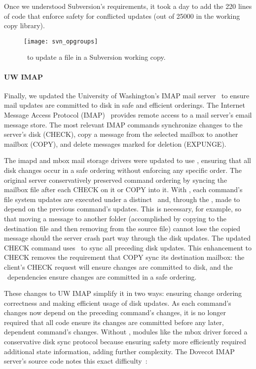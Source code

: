 Once we understood Subversion's requirements, it took a day to add
the 220 lines of code that enforce safety for conflicted updates (out of
25000 in the working copy library).

\begin{figure}[t]
  \centering
  \texttt{[image: svn\_opgroups]}
  \caption{\Patchgroups\ to update a file in a Subversion working copy.}
  \label{fig:svn-order}
\end{figure}

\paragraph{UW IMAP}
\label{sec:patchgroup:uwimap}

Finally, we updated the University of Washington's IMAP mail server~\cite{uwimap} to
ensure mail updates are committed to disk
in safe and efficient orderings.
%
The Internet Message Access Protocol (IMAP)~\cite{rfc3501} provides
remote access to a mail server's email message store.
%
The most relevant IMAP commands synchronize changes to the server's
disk (CHECK), copy a message from the selected mailbox to another
mailbox (COPY), and delete messages marked for deletion (EXPUNGE).

The imapd and mbox mail storage
drivers were updated to use \patchgroups, ensuring that all disk changes occur in a safe
ordering without enforcing any specific order.
%
The original server conservatively preserved command ordering by
syncing the mailbox file after each CHECK on it or COPY into it. With
\patchgroups, each command's file system updates are executed under a
distinct \patchgroup\ and, through the \patchgroup, made to depend on the
previous command's updates. This is necessary, for example, so that
moving a message to another folder (accomplished by copying to the
destination file and then removing from the source file) cannot lose
the copied message should the server crash part way through the disk
updates.
%
The updated CHECK command uses \pgSync\ to sync all preceding disk
updates. This enhancement to CHECK removes the requirement that COPY
sync its destination mailbox: the client's CHECK request will ensure
changes are committed to disk, and the \patchgroup\ dependencies ensure
changes are committed in a safe ordering.

These changes to UW IMAP simplify it in two ways:
%
ensuring change ordering correctness
%
and making efficient usage of disk updates.
%
As each command's changes now depend on the preceding command's
changes, it is no longer required that all code
ensure its changes are committed before any later, dependent
command's changes. Without \patchgroups, modules like the mbox driver
forced a conservative disk sync protocol because ensuring safety more
efficiently required additional state information, adding further
complexity. The Dovecot IMAP server's source code notes this exact
difficulty~\cite[maildir-save.c]{dovecot}:

